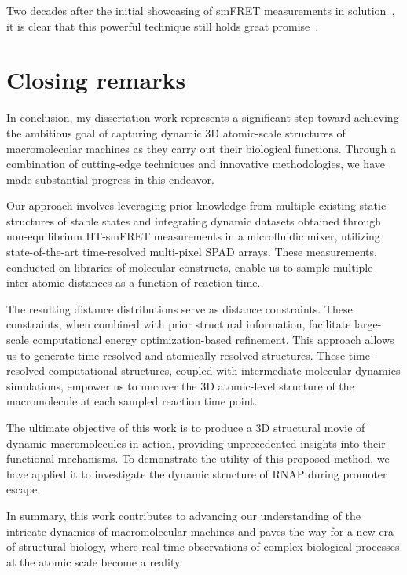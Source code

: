 Two decades after the initial showcasing of smFRET measurements in solution~\cite{deniz_PNAS_1999}, it is clear that this powerful technique still holds great promise~\cite{lerner_Science_2018}.


\section{Closing remarks}
\label{sec:closing_remarks}

In conclusion, my dissertation work represents a significant step toward achieving the ambitious goal of capturing dynamic 3D atomic-scale structures of macromolecular machines as they carry out their biological functions. 
Through a combination of cutting-edge techniques and innovative methodologies, we have made substantial progress in this endeavor.

Our approach involves leveraging prior knowledge from multiple existing static structures of stable states and integrating dynamic datasets obtained through non-equilibrium \ac{HT-smFRET} measurements in a microfluidic mixer, utilizing state-of-the-art time-resolved multi-pixel \ac{SPAD} arrays. 
These measurements, conducted on libraries of molecular constructs, enable us to sample multiple inter-atomic distances as a function of reaction time.

The resulting distance distributions serve as distance constraints. 
These constraints, when combined with prior structural information, facilitate large-scale computational energy optimization-based refinement. 
This approach allows us to generate time-resolved and atomically-resolved structures. 
These time-resolved computational structures, coupled with intermediate molecular dynamics simulations, empower us to uncover the 3D atomic-level structure of the macromolecule at each sampled reaction time point.

The ultimate objective of this work is to produce a 3D structural movie of dynamic macromolecules in action, providing unprecedented insights into their functional mechanisms. 
To demonstrate the utility of this proposed method, we have applied it to investigate the dynamic structure of \ac{RNAP} during promoter escape.

In summary, this work contributes to advancing our understanding of the intricate dynamics of macromolecular machines and paves the way for a new era of structural biology, where real-time observations of complex biological processes at the atomic scale become a reality.
   